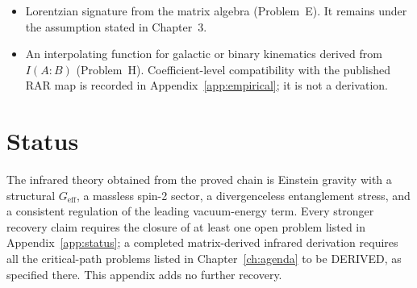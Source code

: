 \begin{itemize}
  \item Lorentzian signature from the matrix algebra
        (Problem~E). It remains under the assumption stated in
        Chapter~3.

  \item An interpolating function for galactic or binary
        kinematics derived from \(I(A:B)\) (Problem~H).
        Coefficient-level compatibility with the published RAR
        map is recorded in Appendix~\ref{app:empirical}; it is
        not a derivation.
\end{itemize}

\section{Status}
\label{sec:recovery-status}

The infrared theory obtained from the proved chain is Einstein
gravity with a structural \(G_{\mathrm{eff}}\), a massless spin-2
sector, a divergenceless entanglement stress, and a consistent
regulation of the leading vacuum-energy term. Every stronger
recovery claim requires the closure of at least one open problem
listed in Appendix~\ref{app:status}; a completed matrix-derived
infrared derivation requires all the critical-path problems listed in
Chapter~\ref{ch:agenda} to be DERIVED, as specified there. This appendix adds no further
recovery.